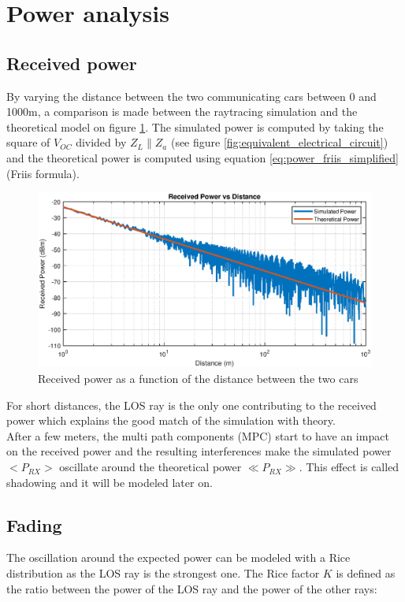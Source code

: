 \documentclass[10pt,a4paper]{ULBreport}
\begin{document}
\section{Power analysis}
\label{sec:power_analysis}
\subsection{Received power}
By varying the distance between the two communicating cars between 0 and 1000m, a comparison is made between the raytracing simulation and the theoretical model on figure \ref{fig:P_RX(d)}. The simulated power is computed by taking the square of $V_{OC}$ divided by $Z_L \mathbin{\|} Z_a$ (see figure \ref{fig:equivalent_electrical_circuit}) and the theoretical power is computed using equation \ref{eq:power_friis_simplified} (Friis formula).

\begin{figure}[H]
    \centering
    \includegraphics[width=1\textwidth]{3_3_log.eps}
    \caption{Received power as a function of the distance between the two cars}
    \label{fig:P_RX(d)}
\end{figure}

For short distances, the LOS ray is the only one contributing to the received power which explains the good match of the simulation with theory. \\
After a few meters, the multi path components (MPC) start to have an impact on the received power and the resulting interferences make the simulated power $<P_{RX}>$ oscillate around the theoretical power $\ll P_{RX} \gg$. This effect is called shadowing and it will be modeled later on.\\

\subsection{Fading}
\label{sec:fading}
The oscillation around the expected power can be modeled with a Rice distribution as the LOS ray is the strongest one. The Rice factor $K$ is defined as the ratio between the power of the LOS ray and the power of the other rays:
\end{document}
